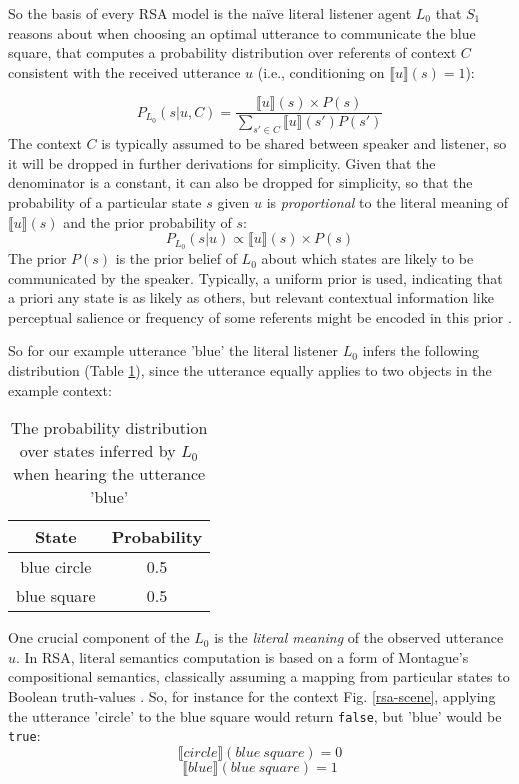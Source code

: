 So the basis of every RSA model is the na\"ive literal listener agent $L_0$ that $S_1$ reasons about when choosing an optimal utterance to communicate the blue square, that computes a probability distribution over referents of context $C$  consistent with the received utterance $u$ (i.e., conditioning on $\llbracket u \rrbracket (s) = 1$): %

$$P_{L_0}(s | u, C) = \frac{\llbracket u \rrbracket (s) \times P(s)}{\sum_{s' \in C} \llbracket u \rrbracket (s') P(s')}$$
The context $C$ is typically assumed to be shared between speaker and listener, so it will be dropped in further derivations for simplicity. Given that the denominator is a constant, it can also be dropped for simplicity, so that the probability of a particular state $s$ given $u$ is \emph{proportional} to the literal meaning of $\llbracket u \rrbracket (s)$ and the prior probability of $s$: 
$$P_{L_0}(s | u) \propto \llbracket u \rrbracket (s) \times P(s)$$
The prior $P(s)$ is the prior belief of $L_0$ about which states are likely to be communicated by the speaker. Typically, a uniform prior is used, indicating that a priori any state is as likely as others, but relevant contextual information like perceptual salience or frequency of some referents might be encoded in this prior \parencite{frank2012predicting}.
  
So for our example utterance 'blue' the literal listener $L_0$ infers the following distribution (Table \ref{rsa-l0}), since the utterance equally applies to two objects in the example context:

\begin{table}[h]
\begin{center}
	\caption{The probability distribution over states inferred by $L_0$ when hearing the utterance 'blue'}
	\label{rsa-l0}
	\vskip 0.12in
	\begin{tabular}{cc}
		State & Probability \\
		\hline
		blue circle & 0.5 \\
		blue square & 0.5 \\
		\hline
	\end{tabular}
\end{center}
\end{table}
One crucial component of the $L_0$ is the \emph{literal meaning} of the observed utterance $u$. In RSA, literal semantics computation is based on a form of Montague’s compositional semantics, classically assuming a mapping from particular states to Boolean truth-values \parencite{montague1973proper} \parencite[but see e.g.][for alternative approaches]{degen2020redundancy}. 
So, for instance for the context Fig. \ref{rsa-scene}, applying the utterance 'circle' to the blue square would return \texttt{false}, but 'blue' would be \texttt{true}:
$$\llbracket circle \rrbracket (blue \: square) = 0$$
$$\llbracket blue \rrbracket (blue\: square) = 1$$

